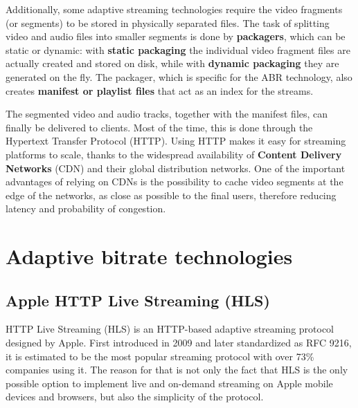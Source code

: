 Additionally, some adaptive streaming technologies require the video fragments (or segments) to be stored in physically separated files. The task of splitting video and audio files into smaller segments is done by \textbf{packagers}, which can be static or dynamic: with \textbf{static packaging} the individual video fragment files are actually created and stored on disk, while with \textbf{dynamic packaging} they are generated on the fly. The packager, which is specific for the ABR technology, also creates \textbf{manifest or playlist files} that act as an index for the streams.

The segmented video and audio tracks, together with the manifest files, can finally be delivered to clients. Most of the time, this is done through the Hypertext Transfer Protocol (HTTP). Using HTTP makes it easy for streaming platforms to scale, thanks to the widespread availability of \textbf{Content Delivery Networks} (CDN) and their global distribution networks. One of the important advantages of relying on CDNs is the possibility to cache video segments at the edge of the networks, as close as possible to the final users, therefore reducing latency and probability of congestion.





\section{Adaptive bitrate technologies}
\label{sec:bg/abr}

\subsection{Apple HTTP Live Streaming (HLS)}
\label{sec:bg/abr/hls}

HTTP Live Streaming (HLS) is an HTTP-based adaptive streaming protocol designed by Apple. First introduced in 2009 and later standardized as RFC 9216, it is estimated to be the most popular streaming protocol with over 73\% companies using it.\cite{rfc8216}\cite{bitmovin} The reason for that is not only the fact that HLS is the only possible option to implement live and on-demand streaming on Apple mobile devices and browsers, but also the simplicity of the protocol.

